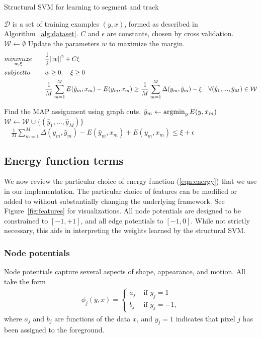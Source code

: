 \documentclass[journal]{IEEEtran}
\begin{document}
\begin{algorithm*}
  \caption{Structural SVM for learning to segment and track}
  \label{alg:ssvm}
  \begin{algorithmic}
    \STATE $\mathcal{D}$ is a set of training examples $(y, x)$,                             formed as described in Algorithm~\ref{alg:dataset}.
\STATE $C$ and $\epsilon$ are constants, chosen by cross validation.
\STATE 
\STATE $\mathcal{W} \leftarrow \emptyset$
\REPEAT
\STATE Update the parameters $w$ to maximize the margin.
\begin{equation*}
  \begin{aligned}
    & \underset{w, \xi}{\relax{minimize}}\quad & & \frac{1}{2} ||w||^2 + C\xi \\
    & \relax{subject to }\quad & & w \geq 0, \quad \xi \geq 0 \\
    & & & \frac{1}{M} \sum_{m=1}^M E ( \hat{y}_m, x_m )
    - E ( y_m, x_m ) \geq \frac{1}{M} \sum_{m=1}^M \Delta(y_m, \hat{y}_m) - \xi \quad \forall (\hat{y}_1, ..., \hat{y}_M) \in \mathcal{W} \\
  \end{aligned}
\end{equation*}

\STATE Find the MAP assignment using graph cuts.
\STATE $\hat{y}_m \leftarrow \operatorname{argmin}_y E (y, x_m )$
\ENDFOR
\STATE $\mathcal{W} \leftarrow \mathcal{W} \cup \{(\hat{y}_1, \dots, \hat{y}_M)\}$
\UNTIL $\quad \frac{1}{M} \sum_{m = 1}^M \Delta(y_m, \hat{y}_m) - E ( \hat{y}_m, x_m) + E ( y_m, x_m ) \leq \xi + \epsilon$
  \end{algorithmic}
\end{algorithm*}


\subsection{Energy function terms}
\label{sec:energy}

We now review the particular choice of energy function (\ref{eqn:energy}) that we use in our implementation. The particular choice of features can be modified or added to without substantially changing the underlying framework. See Figure~\ref{fig:features} for visualizations.  All node potentials are designed to be constrained to $[-1, +1]$, and all edge potentials to $[-1, 0]$.  While not strictly necessary, this aids in interpreting the weights learned by the structural SVM.

\subsubsection{Node potentials}
\label{sec:npot}
Node potentials capture several aspects of shape, appearance, and motion.  All take the form
\begin{align}
  \label{eqn:npot}
  \phi_j(y, x) = 
  \left\{
  \begin{array}{rl}
    a_j & \mbox{ if } y_j = 1 \\
    b_j & \mbox{ if } y_j = -1,
  \end{array} 
  \right.
\end{align}
where $a_j$ and $b_j$ are functions of the data $x$, and $y_j = 1$ indicates that pixel $j$ has been assigned to the foreground.
\end{document}
